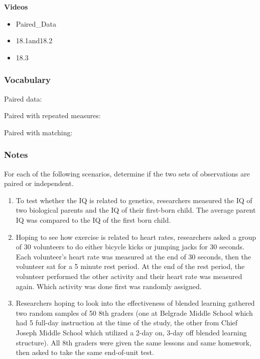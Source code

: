 \documentclass[
]{report}
\providecommand{\tightlist}{%
  \setlength{\itemsep}{0pt}\setlength{\parskip}{0pt}}
\newcommand{\rgs}{\vspace{12pt}} %
\newcommand{\rgi}{\hspace{24pt}}  %
\begin{document}

\textbf{Videos}

\begin{itemize}
\tightlist
\item
  Paired\_Data
\item
  18.1and18.2
\item
  18.3
\end{itemize}


\hypertarget{vocabulary-18}{%
\subsubsection*{Vocabulary}\label{vocabulary-18}}

Paired data:
\rgs

\rgi Paired with repeated measures:
\rgs

\rgi Paired with matching:
\rgs

\hypertarget{notes-23}{%
\subsubsection*{Notes}\label{notes-23}}

For each of the following scenarios, determine if the two sets of observations are paired or independent.

\begin{enumerate}
\def\labelenumi{\arabic{enumi}.}
\item
  To test whether the IQ is related to genetics, researchers measured the IQ of two biological parents and the IQ of their first-born child. The average parent IQ was compared to the IQ of the first born child.
  \rgs
\item
  Hoping to see how exercise is related to heart rates, researchers asked a group of 30 volunteers to do either bicycle kicks or jumping jacks for 30 seconds. Each volunteer's heart rate was measured at the end of 30 seconds, then the volunteer sat for a 5 minute rest period. At the end of the rest period, the volunteer performed the other activity and their heart rate was measured again. Which activity was done first was randomly assigned.
  \rgs
\item
  Researchers hoping to look into the effectiveness of blended learning gathered two random samples of 50 8th graders (one at Belgrade Middle School which had 5 full-day instruction at the time of the study, the other from Chief Joseph Middle School which utilized a 2-day on, 3-day off blended learning structure). All 8th graders were given the same lessons and same homework, then asked to take the same end-of-unit test.
  \rgs
\end{enumerate}
\end{document}
